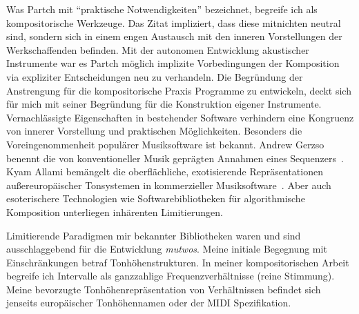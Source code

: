 \documentclass[12pt,a4paper,ngerman]{article}
\begin{document}
\noindent
Was Partch mit ``praktische Notwendigkeiten'' bezeichnet, begreife ich als kompositorische Werkzeuge.
Das Zitat impliziert, dass diese mitnichten neutral sind, sondern sich in einem engen Austausch mit den inneren Vorstellungen der Werkschaffenden befinden.
Mit der autonomen Entwicklung akustischer Instrumente war es Partch möglich implizite Vorbedingungen der Komposition via expliziter Entscheidungen neu zu verhandeln.
Die Begründung der Anstrengung für die kompositorische Praxis Programme zu entwickeln, deckt sich für mich mit seiner Begründung für die Konstruktion eigener Instrumente.
Vernachlässigte Eigenschaften in bestehender Software verhindern eine Kongruenz von innerer Vorstellung und praktischen Möglichkeiten.
Besonders die Voreingenommenheit populärer Musiksoftware ist bekannt.
Andrew Gerzso benennt die von konventioneller Musik geprägten Annahmen eines Sequenzers~\parencite[S. 78]{paradigmsAndComputerMusic}.
Kyam Allami bemängelt die oberflächliche, exotisierende Repräsentationen außereuropäischer Tonsystemen in kommerzieller Musiksoftware~\parencite[S. 59f]{microtonalityAndTheStruggle}.
Aber auch esoterischere Technologien wie Softwarebibliotheken für algorithmische Komposition unterliegen inhärenten Limitierungen.

\bigskip

\noindent
Limitierende Paradigmen mir bekannter Bibliotheken waren und sind ausschlaggebend für die Entwicklung \emph{mutwos}.
Meine initiale Begegnung mit Einschränkungen betraf Tonhöhenstrukturen.
In meiner kompositorischen Arbeit begreife ich Intervalle als ganzzahlige Frequenzverhältnisse (reine Stimmung).
Meine bevorzugte Tonhöhenrepräsentation von Verhältnissen befindet sich jenseits europäischer Tonhöhennamen oder der MIDI Spezifikation.
\end{document}
